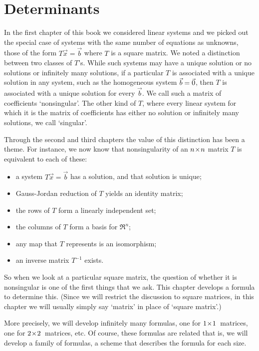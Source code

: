 \chapter{Determinants} 
In the first chapter of this book we considered linear systems 
and we picked out the special case of systems
with the same number of equations as unknowns, 
those of the form \( T\vec{x}=\vec{b} \) where $T$ is a square matrix.
We noted a distinction between two classes of $T$'s.
While such systems may have a unique solution or no solutions or infinitely
many solutions, if a particular $T$ is associated with a unique solution
in any system, such as the homogeneous system $\vec{b}=\vec{0}$, then
$T$ is associated with a unique solution for every $\vec{b}$.
We call such a matrix of coefficients `nonsingular'.
The other kind of $T$, where every linear system for which it is the 
matrix of coefficients has either no solution or infinitely many solutions,
we call `singular'.  

Through the second and third chapters the value of this distinction
has been a theme.
For instance, we now know that 
nonsingularity of an \( n \! \times \! n \)
matrix \( T \) is equivalent to each of these:
\begin{itemize}
   \item a system \( T\vec{x}=\vec{b} \) has a solution, 
          and that solution is unique;
   \item Gauss-Jordan reduction of $T$ yields an identity matrix;
   \item the rows of $T$ form a linearly independent set;
   \item the columns of \( T \) form a basis for \( \Re^n \);
   \item any map that \( T \) represents is an isomorphism;
   \item an inverse matrix \( T^{-1} \) exists.
\end{itemize}
So when we look at a particular square matrix, 
the question of whether it is nonsingular is one of the first things 
that we ask.
This chapter develops a formula to determine this.
(Since we will restrict the discussion to square matrices, in this chapter
we will usually simply say `matrix' in place of `square matrix'.)

More precisely, we will develop infinitely many formulas, 
one for $1 \! \times \! 1$~matrices, one for $2 \! \times \! 2$~matrices, etc.
Of course, these formulas are related \Dash  that is, 
we will develop a family of
formulas, a scheme that describes the formula for each size.






